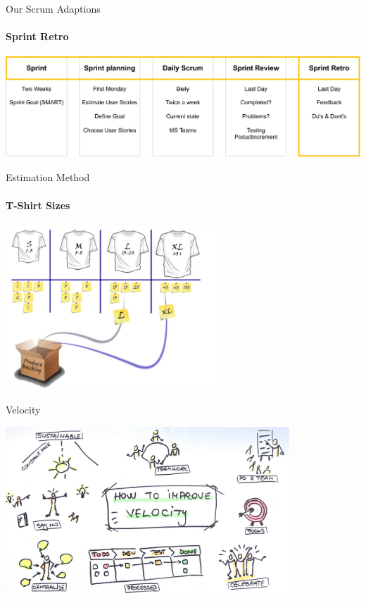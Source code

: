\documentclass[
    ngerman,%
    authorontitle=true,
]{bfhbeamer}
\begin{document}
    \begin{frame}{Our Scrum Adaptions}
        \framesubtitle{Sprint Retro}
        \includegraphics[width=1\textwidth]{pictures/scrum_adaptions-Sprint_Retro}
    \end{frame}

    \begin{frame}{Estimation Method}
        \framesubtitle{T-Shirt Sizes}
        \begin{center}
            \includegraphics[width=0.6\textwidth]{pictures/tshirt_sizes}
        \end{center}
    \end{frame}

    \begin{frame}{Velocity}
        \begin{center}
            \includegraphics[width=0.8\textwidth]{pictures/velocity}
        \end{center}
    \end{frame}
\end{document}
